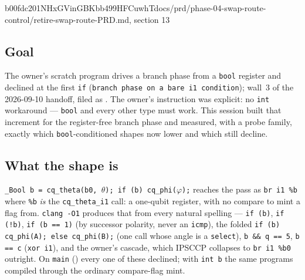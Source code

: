 %
  {b00fdc2}{01NHxGVinGBKbb499HFCuwhT}{docs/prd/phase-04-swap-route-control/retire-swap-route-PRD.md, section 13}

\subsection*{Goal}
The owner's scratch program  drives a branch phase
from a \texttt{bool} register and declined at the first \texttt{if} (\texttt{branch phase on a bare
i1 condition}); wall~3 of the 2026-09-10 handoff, filed as . The
owner's instruction was explicit: no \texttt{int} workaround --- \texttt{bool} and every other type
must work. This session built that increment for the register-free branch phase and measured,
with a probe family, exactly which \texttt{bool}-conditioned shapes now lower and which still decline.

\subsection*{What the shape is}
\texttt{\_Bool b = cq\_theta(b0, }\(\theta\)\texttt{); if (b) cq\_phi(}\(\varphi\)\texttt{);} reaches
the pass as \texttt{br i1 \%b} where \texttt{\%b} \emph{is} the \texttt{cq\_theta\_i1} call: a
one-qubit register, with no compare to mint a flag from. \texttt{clang -O1} produces that from every
natural spelling --- \texttt{if (b)}, \texttt{if (!b)}, \texttt{if (b == 1)} (by successor polarity,
never an \texttt{icmp}), the folded \texttt{if (b) cq\_phi(A); else cq\_phi(B);} (one call whose angle
is a \texttt{select}), \texttt{b \&\& q == 5}, \texttt{b == c} (\texttt{xor i1}), and the owner's
cascade, which IPSCCP collapses to \texttt{br i1 \%b0} outright. On \texttt{main} ()
every one of these declined; with \texttt{int b} the same programs compiled through the ordinary
compare-flag mint.

